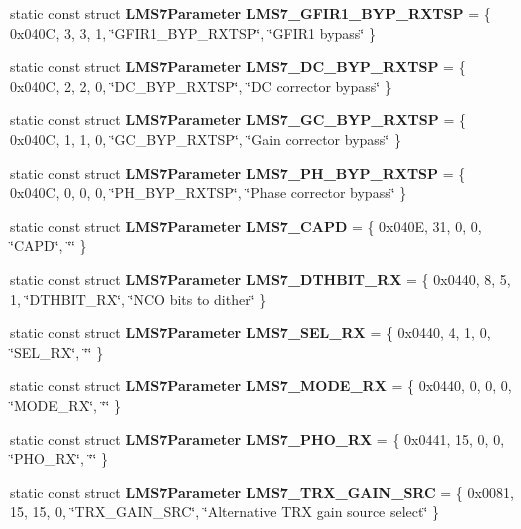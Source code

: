 \begin{DoxyCompactItemize}
\item 
static const struct {\bf L\+M\+S7\+Parameter} {\bf L\+M\+S7\+\_\+\+G\+F\+I\+R1\+\_\+\+B\+Y\+P\+\_\+\+R\+X\+T\+SP} = \{ 0x040\+C, 3, 3, 1, \char`\"{}\+G\+F\+I\+R1\+\_\+\+B\+Y\+P\+\_\+\+R\+X\+T\+S\+P\char`\"{}, \char`\"{}\+G\+F\+I\+R1 bypass\char`\"{} \}
\item 
static const struct {\bf L\+M\+S7\+Parameter} {\bf L\+M\+S7\+\_\+\+D\+C\+\_\+\+B\+Y\+P\+\_\+\+R\+X\+T\+SP} = \{ 0x040\+C, 2, 2, 0, \char`\"{}\+D\+C\+\_\+\+B\+Y\+P\+\_\+\+R\+X\+T\+S\+P\char`\"{}, \char`\"{}\+D\+C corrector bypass\char`\"{} \}
\item 
static const struct {\bf L\+M\+S7\+Parameter} {\bf L\+M\+S7\+\_\+\+G\+C\+\_\+\+B\+Y\+P\+\_\+\+R\+X\+T\+SP} = \{ 0x040\+C, 1, 1, 0, \char`\"{}\+G\+C\+\_\+\+B\+Y\+P\+\_\+\+R\+X\+T\+S\+P\char`\"{}, \char`\"{}\+Gain corrector bypass\char`\"{} \}
\item 
static const struct {\bf L\+M\+S7\+Parameter} {\bf L\+M\+S7\+\_\+\+P\+H\+\_\+\+B\+Y\+P\+\_\+\+R\+X\+T\+SP} = \{ 0x040\+C, 0, 0, 0, \char`\"{}\+P\+H\+\_\+\+B\+Y\+P\+\_\+\+R\+X\+T\+S\+P\char`\"{}, \char`\"{}\+Phase corrector bypass\char`\"{} \}
\item 
static const struct {\bf L\+M\+S7\+Parameter} {\bf L\+M\+S7\+\_\+\+C\+A\+PD} = \{ 0x040\+E, 31, 0, 0, \char`\"{}\+C\+A\+P\+D\char`\"{}, \char`\"{}\char`\"{} \}
\item 
static const struct {\bf L\+M\+S7\+Parameter} {\bf L\+M\+S7\+\_\+\+D\+T\+H\+B\+I\+T\+\_\+\+RX} = \{ 0x0440, 8, 5, 1, \char`\"{}\+D\+T\+H\+B\+I\+T\+\_\+\+R\+X\char`\"{}, \char`\"{}\+N\+C\+O bits to dither\char`\"{} \}
\item 
static const struct {\bf L\+M\+S7\+Parameter} {\bf L\+M\+S7\+\_\+\+S\+E\+L\+\_\+\+RX} = \{ 0x0440, 4, 1, 0, \char`\"{}\+S\+E\+L\+\_\+\+R\+X\char`\"{}, \char`\"{}\char`\"{} \}
\item 
static const struct {\bf L\+M\+S7\+Parameter} {\bf L\+M\+S7\+\_\+\+M\+O\+D\+E\+\_\+\+RX} = \{ 0x0440, 0, 0, 0, \char`\"{}\+M\+O\+D\+E\+\_\+\+R\+X\char`\"{}, \char`\"{}\char`\"{} \}
\item 
static const struct {\bf L\+M\+S7\+Parameter} {\bf L\+M\+S7\+\_\+\+P\+H\+O\+\_\+\+RX} = \{ 0x0441, 15, 0, 0, \char`\"{}\+P\+H\+O\+\_\+\+R\+X\char`\"{}, \char`\"{}\char`\"{} \}
\item 
static const struct {\bf L\+M\+S7\+Parameter} {\bf L\+M\+S7\+\_\+\+T\+R\+X\+\_\+\+G\+A\+I\+N\+\_\+\+S\+RC} = \{ 0x0081, 15, 15, 0, \char`\"{}\+T\+R\+X\+\_\+\+G\+A\+I\+N\+\_\+\+S\+R\+C\char`\"{}, \char`\"{}\+Alternative T\+R\+X gain source select\char`\"{} \}

\end{DoxyCompactItemize}
